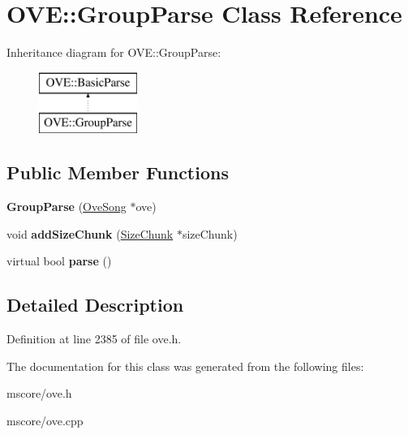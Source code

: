 \hypertarget{class_o_v_e_1_1_group_parse}{}\section{O\+VE\+:\+:Group\+Parse Class Reference}
\label{class_o_v_e_1_1_group_parse}
Inheritance diagram for O\+VE\+:\+:Group\+Parse\+:\begin{figure}[H]
\begin{center}
\leavevmode
\includegraphics[height=2.000000cm]{class_o_v_e_1_1_group_parse}
\end{center}
\end{figure}
\subsection*{Public Member Functions}
\begin{DoxyCompactItemize}
\item 
\mbox{\label{class_o_v_e_1_1_group_parse_a4679deeab2d246b119b15f322c0d70dc}} 
{\bfseries Group\+Parse} (\hyperlink{class_o_v_e_1_1_ove_song}{Ove\+Song} $\ast$ove)
\item 
\mbox{\label{class_o_v_e_1_1_group_parse_a114048968ddaaee1405fbc8dbd1b6fd9}} 
void {\bfseries add\+Size\+Chunk} (\hyperlink{class_o_v_e_1_1_size_chunk}{Size\+Chunk} $\ast$size\+Chunk)
\item 
\mbox{\label{class_o_v_e_1_1_group_parse_aaa34472e901a3d326f88b3f13f00a646}} 
virtual bool {\bfseries parse} ()
\end{DoxyCompactItemize}


\subsection{Detailed Description}


Definition at line 2385 of file ove.\+h.



The documentation for this class was generated from the following files\+:\begin{DoxyCompactItemize}
\item 
mscore/ove.\+h\item 
mscore/ove.\+cpp\end{DoxyCompactItemize}
